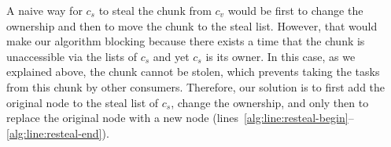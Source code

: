 A naive way for $c_s$ to steal the chunk from $c_v$ would be first to change the ownership and then to move the chunk to the steal list. However, that would make our algorithm blocking because there exists a time that the chunk is unaccessible via the lists of $c_s$ and yet $c_s$ is its owner. In this case, as we explained above, the chunk cannot be stolen, which prevents taking the tasks from this chunk by other consumers. Therefore, our solution is to first add the original node to the steal list of $c_s$, change the ownership, and only then to replace the original node with a new node (lines~\ref{alg:line:resteal-begin}--\ref{alg:line:resteal-end}). 
 







